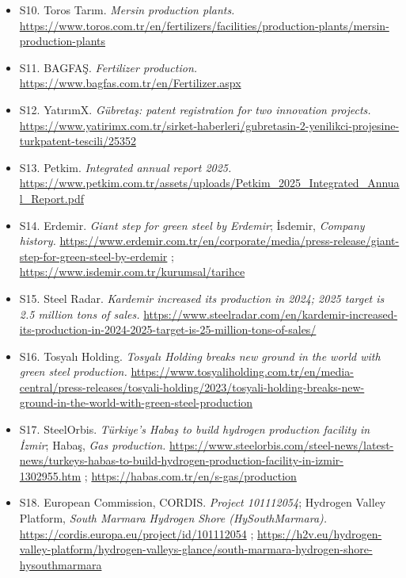 \documentclass[11pt,a4paper]{article}
\begin{document}
\begin{itemize}
  \item S10. Toros Tarım. \textit{Mersin production plants.} \url{https://www.toros.com.tr/en/fertilizers/facilities/production-plants/mersin-production-plants}

  \item S11. BAGFAŞ. \textit{Fertilizer production.} \url{https://www.bagfas.com.tr/en/Fertilizer.aspx}

  \item S12. YatırımX. \textit{Gübretaş: patent registration for two innovation projects.} \url{https://www.yatirimx.com.tr/sirket-haberleri/gubretasin-2-yenilikci-projesine-turkpatent-tescili/25352}

  \item S13. Petkim. \textit{Integrated annual report 2025.} \url{https://www.petkim.com.tr/assets/uploads/Petkim_2025_Integrated_Annual_Report.pdf}

  \item S14. Erdemir. \textit{Giant step for green steel by Erdemir}; İsdemir, \textit{Company history.} \url{https://www.erdemir.com.tr/en/corporate/media/press-release/giant-step-for-green-steel-by-erdemir} ; \url{https://www.isdemir.com.tr/kurumsal/tarihce}

  \item S15. Steel Radar. \textit{Kardemir increased its production in 2024; 2025 target is 2.5 million tons of sales.} \url{https://www.steelradar.com/en/kardemir-increased-its-production-in-2024-2025-target-is-25-million-tons-of-sales/}

  \item S16. Tosyalı Holding. \textit{Tosyalı Holding breaks new ground in the world with green steel production.} \url{https://www.tosyaliholding.com.tr/en/media-central/press-releases/tosyali-holding/2023/tosyali-holding-breaks-new-ground-in-the-world-with-green-steel-production}

  \item S17. SteelOrbis. \textit{Türkiye's Habaş to build hydrogen production facility in İzmir}; Habaş, \textit{Gas production.} \url{https://www.steelorbis.com/steel-news/latest-news/turkeys-habas-to-build-hydrogen-production-facility-in-izmir-1302955.htm} ; \url{https://habas.com.tr/en/s-gas/production}

  \item S18. European Commission, CORDIS. \textit{Project 101112054}; Hydrogen Valley Platform, \textit{South Marmara Hydrogen Shore (HySouthMarmara).} \url{https://cordis.europa.eu/project/id/101112054} ; \url{https://h2v.eu/hydrogen-valley-platform/hydrogen-valleys-glance/south-marmara-hydrogen-shore-hysouthmarmara}


\end{itemize}
\end{document}
